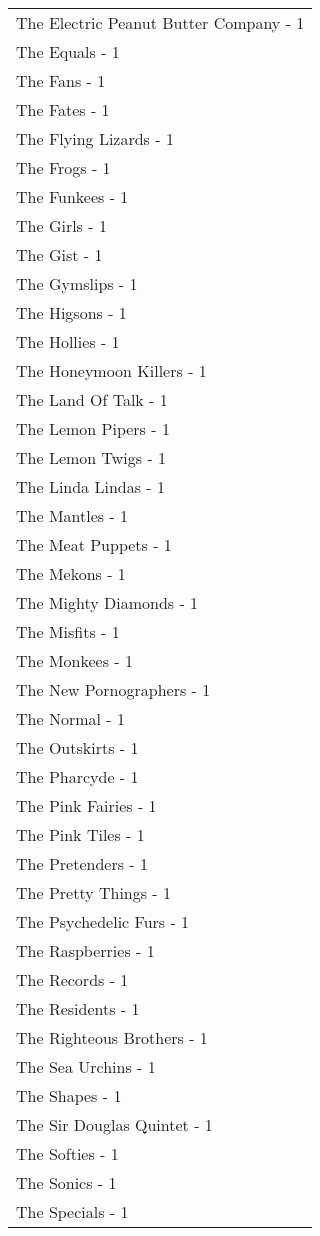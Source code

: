 \documentclass[
]{article}
\begin{document}
\begin{longtable}{l}
The Electric Peanut Butter Company - 1 \\ 
The Equals - 1 \\ 
The Fans - 1 \\ 
The Fates - 1 \\ 
The Flying Lizards - 1 \\ 
The Frogs - 1 \\ 
The Funkees - 1 \\ 
The Girls - 1 \\ 
The Gist - 1 \\ 
The Gymslips - 1 \\ 
The Higsons - 1 \\ 
The Hollies - 1 \\ 
The Honeymoon Killers - 1 \\ 
The Land Of Talk - 1 \\ 
The Lemon Pipers - 1 \\ 
The Lemon Twigs - 1 \\ 
The Linda Lindas - 1 \\ 
The Mantles - 1 \\ 
The Meat Puppets - 1 \\ 
The Mekons - 1 \\ 
The Mighty Diamonds - 1 \\ 
The Misfits - 1 \\ 
The Monkees - 1 \\ 
The New Pornographers - 1 \\ 
The Normal - 1 \\ 
The Outskirts - 1 \\ 
The Pharcyde - 1 \\ 
The Pink Fairies - 1 \\ 
The Pink Tiles - 1 \\ 
The Pretenders - 1 \\ 
The Pretty Things - 1 \\ 
The Psychedelic Furs - 1 \\ 
The Raspberries - 1 \\ 
The Records - 1 \\ 
The Residents - 1 \\ 
The Righteous Brothers - 1 \\ 
The Sea Urchins - 1 \\ 
The Shapes - 1 \\ 
The Sir Douglas Quintet - 1 \\ 
The Softies - 1 \\ 
The Sonics - 1 \\ 
The Specials - 1 \\ 

\end{longtable}
\end{document}
